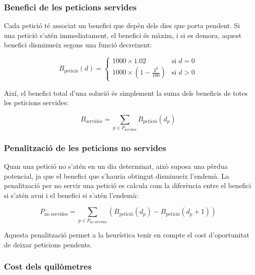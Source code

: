 \subsubsection{Benefici de les peticions servides}

Cada petició té associat un benefici que depèn dels dies que porta pendent. Si una petició s’atén immediatament, el benefici és màxim, i si es demora, aquest benefici disminueix segons una funció decreixent:

\begin{equation}
B_{\text{petició}}(d) = 
\begin{cases}
1000 \times 1.02 & \text{si } d = 0 \\
1000 \times \left(1 - \frac{2^d}{100}\right) & \text{si } d > 0
\end{cases}
\label{eq:benefici-peticio}
\end{equation}

Així, el benefici total d’una solució és simplement la suma dels beneficis de totes les peticions servides:

\begin{equation}
B_{\text{servides}} = \sum_{p \in P_{\text{servides}}} B_{\text{petició}}(d_p)
\end{equation}

\vspace{0.5cm}

\subsubsection{Penalització de les peticions no servides}

Quan una petició no s’atén en un dia determinat, això suposa una pèrdua potencial, ja que el benefici que s’hauria obtingut disminueix l’endemà. La penalització per no servir una petició es calcula com la diferència entre el benefici si s’atén avui i el benefici si s’atén l’endemà:

\begin{equation}
P_{\text{no servides}} = \sum_{p \in P_{\text{no servides}}} \left(B_{\text{petició}}(d_p) - B_{\text{petició}}(d_p + 1)\right)
\end{equation}

Aquesta penalització permet a la heurística tenir en compte el cost d’oportunitat de deixar peticions pendents.

\vspace{0.5cm}

\subsubsection{Cost dels quilòmetres}

